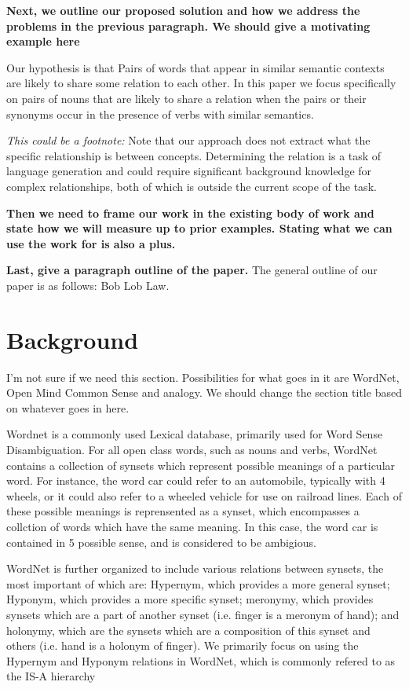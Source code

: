 \documentclass[11pt]{article}
\begin{document}
{\bf Next, we outline our proposed solution and how we address the problems in
  the previous paragraph.  We should give a motivating example here}  

Our hypothesis is that Pairs of words that appear in similar semantic contexts
are likely to share some relation to each other.  In this paper we focus
specifically on pairs of nouns that are likely to share a relation when the
pairs or their synonyms occur in the presence of verbs with similar semantics.  

\emph{This could be a footnote:} Note that our approach does not extract what the
specific relationship is between concepts.  Determining the relation is a task
of language generation and could require significant background knowledge for
complex relationships, both of which is outside the current scope of the task.

{\bf Then we need to frame our work in the existing body of work and state how
  we will measure up to prior examples.  Stating what we can use the work for is
  also a plus.}

{\bf Last, give a paragraph outline of the paper.}  The general outline of our
paper is as follows: Bob Lob Law.

\section{Background}

I'm not sure if we need this section.  Possibilities for what goes in it are
WordNet, Open Mind Common Sense and analogy.  We should change the
section title based on whatever goes in here.

Wordnet \cite{fellbaum98wordnet} is a commonly used Lexical database, primarily used for Word Sense
Disambiguation.  For all open class words, such as nouns and verbs, WordNet
contains a collection of synsets which represent possible meanings of a
particular word.  For instance, the word car could refer to an automobile,
typically with 4 wheels, or it could also refer to a wheeled vehicle for use on
railroad lines.  Each of these possible meanings is reprensented as a synset,
which encompasses a collction of words which have the same meaning.  In this
case, the word car is contained in 5 possible sense, and is considered to be
ambigious.  

WordNet is further organized to include various relations between synsets, the
most important of which are: Hypernym, which provides a more general synset;
Hyponym, which provides a more specific synset; meronymy, which provides synsets
which are a part of another synset (i.e. finger is a meronym of hand); and
holonymy, which are the synsets which are a composition of this synset and
others (i.e. hand is a holonym of finger).  We primarily focus on using the
Hypernym and Hyponym relations in WordNet, which is commonly refered to as the
IS-A hierarchy
\end{document}
